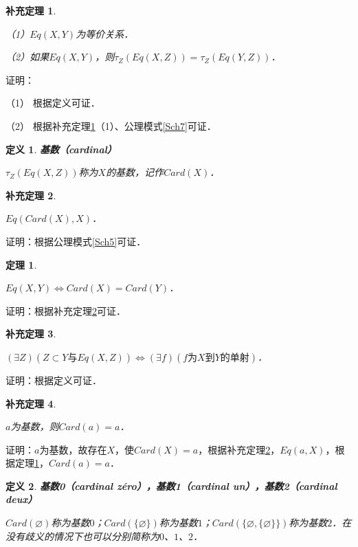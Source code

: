 \documentclass[12pt, a4paper, oneside]{book}
\newtheorem{theo}{定理}
\newtheorem{cor}{补充定理}
\newtheorem{de}{定义}
\begin{document}
			\begin{cor}\label{cor286}
				\hfill\par
				（1）$Eq(X, Y)$为等价关系．
				\par
				（2）如果$Eq(X, Y)$，则$\tau_Z(Eq(X, Z))=\tau_Z(Eq(Y, Z))$．
			\end{cor}
			证明：
			\par
			（1）	根据定义可证．
			\par
			（2）	根据补充定理\ref{cor286}（1）、公理模式\ref{Sch7}可证．
			
			\begin{de}
				\textbf{基数（cardinal）}
				\par
				$\tau_Z(Eq(X, Z))$称为$X$的基数，记作$Card(X)$．
			\end{de}
			
			\begin{cor}\label{cor287}
				\hfill\par
				$Eq(Card(X), X)$．
			\end{cor}
			证明：根据公理模式\ref{Sch5}可证．
			
			\begin{theo}\label{theo88}
				\hfill\par
				$Eq(X, Y)\Leftrightarrow Card(X)= Card(Y)$．
			\end{theo}
			证明：根据补充定理\ref{cor287}可证．
			
			\begin{cor}\label{cor288}
				\hfill\par
				$(\exists Z)(Z\subset Y\text{与}Eq(X, Z))\Leftrightarrow (\exists f)(f\text{为}X\text{到}Y\text{的单射})$．
			\end{cor}
			证明：根据定义可证．

			\begin{cor}\label{cor289}
				\hfill\par
				$a$为基数，则$Card(a)=a$．
			\end{cor}
			证明：$a$为基数，故存在$X$，使$Card(X)=a$，根据补充定理\ref{cor287}，$Eq(a, X)$，根据定理\ref{theo88}，$Card(a)=a$．

			\begin{de}
				\textbf{基数0（cardinal zéro），基数1（cardinal un），基数2（cardinal deux）}
				\par
				$Card(\varnothing)$称为基数$0$；$Card(\{\varnothing\})$称为基数$1$；$Card(\{\varnothing, \{\varnothing\}\})$称为基数$2$．在没有歧义的情况下也可以分别简称为$0$、$1$、$2$．				
			\end{de}
			
\end{document}
